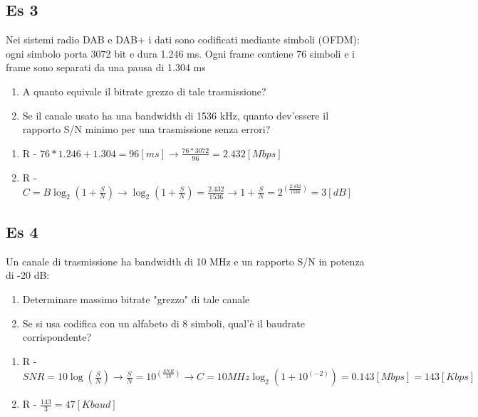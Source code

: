 \documentclass{article}
\begin{document}
    \subsection{Es 3}
      Nei sistemi radio DAB e DAB+ i dati sono codificati mediante simboli (OFDM): ogni simbolo porta 3072 bit e dura 1.246 ms. Ogni frame contiene 76 simboli e i frame sono separati da una pausa di 1.304 ms
      \begin{enumerate}
        \item A quanto equivale il bitrate grezzo di tale trasmissione?
        \item Se il canale usato ha una bandwidth di 1536 kHz, quanto dev'essere il rapporto S/N minimo per una trasmissione senza errori?
      \end{enumerate}
      \begin{enumerate}
        \item R - $76*1.246+1.304=96 [ms] \rightarrow \frac{76*3072}{96}=2.432 [Mbps]$
        \item R - $C=B\log_2(1+\frac{S}{N}) \rightarrow \log_2(1+\frac{S}{N})=\frac{2.432}{1536} \rightarrow 1+\frac{S}{N}=2^(\frac{2.432}{1536})=3 [dB]$
      \end{enumerate}
    \subsection{Es 4}
      Un canale di trasmissione ha bandwidth di 10 MHz e un rapporto S/N in potenza di -20 dB:
      \begin{enumerate}
        \item Determinare massimo bitrate "grezzo" di tale canale
        \item Se si usa codifica con un alfabeto di 8 simboli, qual'è il baudrate corrispondente?
      \end{enumerate}
      \begin{enumerate}
        \item R - $SNR=10\log(\frac{S}{N}) \rightarrow \frac{S}{N}=10^(\frac{SNR}{10}) \rightarrow C=10MHz\log_2(1+10^(-2))=0.143 [Mbps] = 143 [Kbps]$
        \item R - $\frac{143}{3}=47 [Kbaud]$
      \end{enumerate}
\end{document}
